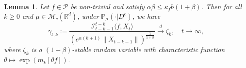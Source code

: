 \documentclass[12pt,a4paper]{amsart}
\theoremstyle{plain}
\newtheorem{lem}[thm]{Lemma}
\theoremstyle{definition}
\numberwithin{equation}{section}
\begin{document}
\begin{lem}\label{lem: mainlemma}
Let $f\in \mathcal{P}$ be non-trivial and satisfy $\alpha\beta\leq \kappa_fb(1+\beta)$.
    Then for all $k\geq 0$ and $\mu \in \mathcal M_c(\mathbb R^d)$, under $\mathbb{P}_{\mu}(\cdot | D ^c)$, we have
\begin{equation}
    \gamma_{t,k}
    :=\frac{\mathcal I_{t-k-1}^{t-k}\langle f ,X_t\rangle}{(e^{\alpha (k+1)}\|X_{t-k-1}\|)^{\frac{1}{1+\beta}}}\xrightarrow{d}\zeta_k, \quad t\rightarrow \infty, \label{limitdistribution1}
\end{equation}
    where $\zeta_k$ is a $(1+\beta)$-stable random variable with characteristic function
$\theta\mapsto \exp(m_k[\theta f])$.
\end{lem}
\end{document}
